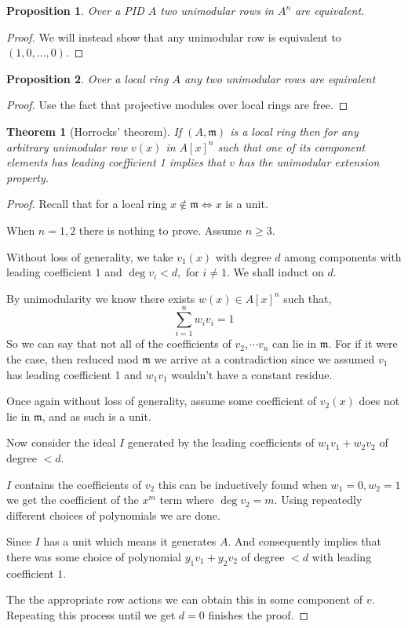 \documentclass[12pt]{article}
\numberwithin{equation}{section}
\newtheorem{theorem}{Theorem}[section]
\newtheorem{proposition}{Proposition}[section]
\begin{document}
	\begin{proposition}
		Over a PID $A$ two unimodular rows in $A^n$ are equivalent.
	\end{proposition}
	\begin{proof}
		We will instead show that any unimodular row is equivalent to $(1,0,\dots, 0)$.
	\end{proof}
	\begin{proposition}
		Over a local ring $A$ any two unimodular rows are equivalent
	\end{proposition}
	\begin{proof}
		Use the fact that projective modules over local rings are free.
	\end{proof}
	\begin{theorem}[Horrocks' theorem]
	If $(A, \mathfrak{m})$ is a local ring then for any arbitrary unimodular row $v(x)$ in $A[x]^n$ such that one of its component elements has leading coefficient 1 implies that $v$ has the unimodular extension property.
	\end{theorem}
	\begin{proof}
	Recall that for a local ring $x \not \in \mathfrak m \iff x  $ is a unit.
	
	When $n=1,2 $ there is nothing to prove. Assume $n \geq 3$.
	
	
	Without loss of generality, we take $v_1(x)$ with degree $d $ among components with leading coefficient $1$ and $\deg v_i < d, $ for $i \neq 1$. We shall induct on $d$.
	
	By unimodularity we know there exists $w(x)\in A[x]^n$ such that,
	\[ \sum_{i=1}^n w_i v_i = 1 \]
	So we can say that not all of the coefficients of $v_2, \cdots v_n $ can lie in $\mathfrak m$. For if it were the case, then reduced mod $\mathfrak m$ we arrive at a contradiction since we assumed $v_1 $ has leading coefficient 1 and $w_1v_1$ wouldn't have a constant residue.
	
	Once again without loss of generality, assume some coefficient of $v_2(x)$ does not lie in $\mathfrak m$, and as such is a unit.
	
	Now consider the ideal $I$ generated by the leading coefficients of $w_1v_1+w_2v_2$ of degree $< d.$ 
	
	$I$ contains the coefficients of $v_2$ this can be inductively found when $w_1=0, w_2=1$ we get the coefficient of the $x^m$ term where $\deg v_2 = m$.
	Using repeatedly different choices of polynomials we are done.
	
	Since $I$ has a unit which means it generates $A$. And consequently implies that there was some choice of polynomial $y_1v_1+y_2v_2$ of degree $<d$ with leading coefficient $1$.
	
	The the appropriate row actions we can obtain this in some component of $v$. Repeating this process until we get $d=0$ finishes the proof.
	\end{proof}
\end{document}
